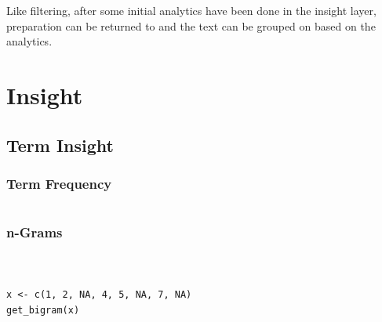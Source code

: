 \documentclass[11pt, a4paper, oneside]{report}
\begin{document}
Like filtering, after some initial analytics have been done in the
insight layer, preparation can be returned to and the text can be
grouped on based on the analytics.

\section{Insight}\label{sec:insight}

\subsection{Term Insight}\label{sec:term-insight}

\subsubsection{Term Frequency}\label{sec:term-frequency}

\inputminted[frame=lines,fontsize=\scriptsize,xleftmargin=\parindent,linenos]{R}{R/term-freq.R}

\subsubsection{n-Grams}\label{sec:n-grams}

\inputminted[frame=lines,fontsize=\scriptsize,xleftmargin=\parindent,linenos]{R}{R/get-bigram.R}

\inputminted[frame=lines,fontsize=\scriptsize,xleftmargin=\parindent,linenos]{R}{R/concat-walk.R}

\inputminted[frame=lines,fontsize=\scriptsize,xleftmargin=\parindent,linenos]{R}{R/concat-walk.R}

\begin{verbatim}
x <- c(1, 2, NA, 4, 5, NA, 7, NA)
get_bigram(x)
\end{verbatim}

\inputminted[frame=lines,fontsize=\scriptsize,xleftmargin=\parindent,linenos]{R}{R/get-ngram.R}

\inputminted[frame=lines,fontsize=\scriptsize,xleftmargin=\parindent,linenos]{R}{R/ngram-freq.R}
\end{document}
